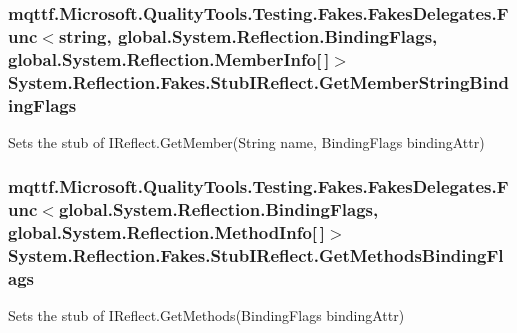 \hypertarget{class_system_1_1_reflection_1_1_fakes_1_1_stub_i_reflect_aef3171bf34c1820f32bf43e676da4fd7}{
\subsubsection[{Get\-Member\-String\-Binding\-Flags}]{\setlength{\rightskip}{0pt plus 5cm}mqttf.\-Microsoft.\-Quality\-Tools.\-Testing.\-Fakes.\-Fakes\-Delegates.\-Func$<$string, global.\-System.\-Reflection.\-Binding\-Flags, global.\-System.\-Reflection.\-Member\-Info\mbox{[}$\,$\mbox{]}$>$ System.\-Reflection.\-Fakes.\-Stub\-I\-Reflect.\-Get\-Member\-String\-Binding\-Flags}}\label{class_system_1_1_reflection_1_1_fakes_1_1_stub_i_reflect_aef3171bf34c1820f32bf43e676da4fd7}


Sets the stub of I\-Reflect.\-Get\-Member(\-String name, Binding\-Flags binding\-Attr)

\hypertarget{class_system_1_1_reflection_1_1_fakes_1_1_stub_i_reflect_aaf60a0fb0a82519e5b849efef62dc574}{
\subsubsection[{Get\-Methods\-Binding\-Flags}]{\setlength{\rightskip}{0pt plus 5cm}mqttf.\-Microsoft.\-Quality\-Tools.\-Testing.\-Fakes.\-Fakes\-Delegates.\-Func$<$global.\-System.\-Reflection.\-Binding\-Flags, global.\-System.\-Reflection.\-Method\-Info\mbox{[}$\,$\mbox{]}$>$ System.\-Reflection.\-Fakes.\-Stub\-I\-Reflect.\-Get\-Methods\-Binding\-Flags}}\label{class_system_1_1_reflection_1_1_fakes_1_1_stub_i_reflect_aaf60a0fb0a82519e5b849efef62dc574}


Sets the stub of I\-Reflect.\-Get\-Methods(\-Binding\-Flags binding\-Attr)

